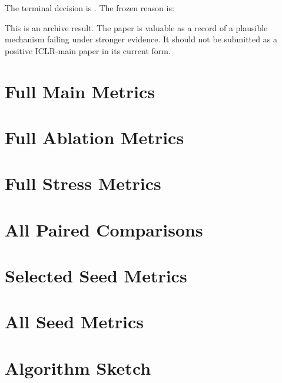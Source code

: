 \documentclass{article}
\begin{document}
The terminal decision is \textbf{\PaperDecision}.
The frozen reason is:
\begin{quote}
\PaperDecisionReason
\end{quote}
This is an archive result.
The paper is valuable as a record of a plausible mechanism failing under stronger evidence.
It should not be submitted as a positive ICLR-main paper in its current form.

\appendix

\section{Full Main Metrics}


\section{Full Ablation Metrics}


\section{Full Stress Metrics}


\section{All Paired Comparisons}


\section{Selected Seed Metrics}


\section{All Seed Metrics}


\section{Algorithm Sketch}
\end{document}
